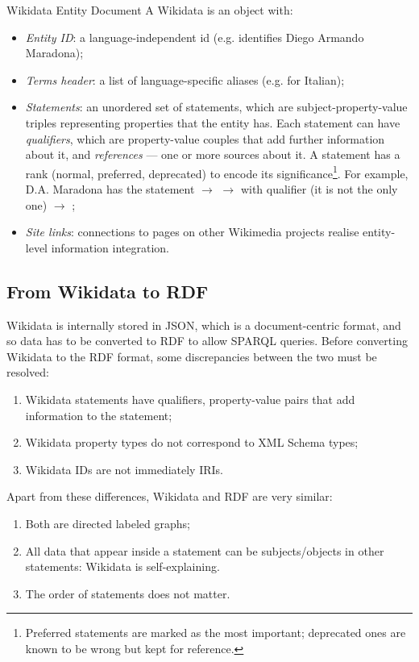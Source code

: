 \begin{definition}{Wikidata Entity Document}
    A Wikidata  is an object with:
    \begin{itemize}
        \item \emph{Entity ID}: a language-independent id (e.g.  identifies Diego Armando Maradona);
        \item \emph{Terms header}: a list of language-specific aliases (e.g.  for Italian);
        \item \emph{Statements}: an unordered set of statements, which are subject-property-value triples representing properties that the entity has. Each statement can have \emph{qualifiers}, which are property-value couples that add further information about it, and \emph{references} --- one or more sources about it. 
            A statement has a rank (normal, preferred, deprecated) to encode its significance\footnote{Preferred statements are marked as the most important; deprecated ones are known to be wrong but kept for reference.}. 
            For example, D.A. Maradona has the statement  \(\to\)  \(\to\)  with qualifier (it is not the only one) \(\to\) ;
        \item \emph{Site links}: connections to pages on other Wikimedia projects realise entity-level information integration.
    \end{itemize}
\end{definition}

\subsection{From Wikidata to RDF}
Wikidata is internally stored in JSON, which is a document-centric format, and so data has to be converted to RDF to allow SPARQL queries.
Before converting Wikidata to the RDF format, some discrepancies between the two must be resolved:
\begin{enumerate}
    \item Wikidata statements have qualifiers, property-value pairs that add information to the statement;
    \item Wikidata property types do not correspond to XML Schema types; 
    \item Wikidata IDs are not immediately IRIs.
\end{enumerate}
Apart from these differences, Wikidata and RDF are very similar: 
\begin{enumerate}
    \item Both are directed labeled graphs;
    \item All data that appear inside a statement can be subjects/objects in other statements: Wikidata is self-explaining. 
    \item The order of statements does not matter.
\end{enumerate}

